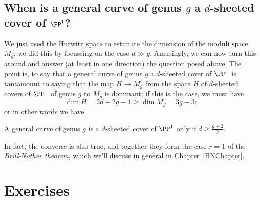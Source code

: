 \subsection{When is a general curve of genus $g$ a $d$-sheeted cover of $\PP^1$?}

We just used the Hurwitz space to estimate the dimension of the moduli space $M_g$; we did this by focussing on the case $d \gg  g$. Amusingly, we can now turn this around and answer (at least in one direction) the question posed above. The point is, to say that a general curve of genus $g$ a $d$-sheeted cover of $\PP^1$ is tantamount to saying that the map $H \to M_g$ from the space $H$ of $d$-sheeted covers of $\PP^1$ of genus $g$ to $M_g$ is dominant; if this is the case, we must have
$$
\dim H = 2d+2g-1 \geq \dim M_g = 3g-3;
$$
or in other words we have

\begin{corollary}\label{BN dim 1}
A general curve of genus $g$ is a $d$-sheeted cover of $\PP^1$ only if $d \geq \frac{g+2}{2}$.
\end{corollary}

In fact, the converse is also true, and together they form the case $r=1$ of the \emph{Brill-Nother theorem}, which we'll discuss in general in Chapter~\ref{BNChapter}. 

\section{Exercises}

% 

